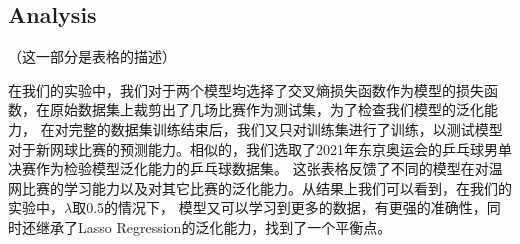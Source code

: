 \documentclass{ctexart}
\begin{document}
\subsection{Analysis}
（这一部分是表格的描述）\par
在我们的实验中，我们对于两个模型均选择了交叉熵损失函数作为模型的损失函数，在原始数据集上裁剪出了几场比赛作为测试集，为了检查我们模型的泛化能力，
在对完整的数据集训练结束后，我们又只对训练集进行了训练，以测试模型对于新网球比赛的预测能力。相似的，我们选取了2021年东京奥运会的乒乓球男单决赛作为检验模型泛化能力的乒乓球数据集。
这张表格反馈了不同的模型在对温网比赛的学习能力以及对其它比赛的泛化能力。从结果上我们可以看到，在我们的实验中，$\lambda$取0.5的情况下，
模型又可以学习到更多的数据，有更强的准确性，同时还继承了Lasso Regression的泛化能力，找到了一个平衡点。
\end{document}
